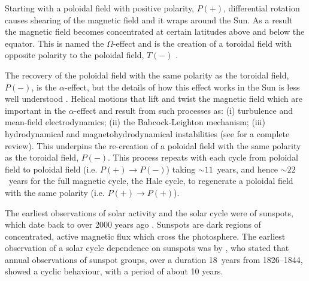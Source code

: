 Starting with a poloidal field with positive polarity, $P(+)$, differential rotation causes shearing of the magnetic field and it wraps around the Sun. As a result the magnetic field becomes concentrated at certain latitudes above and below the equator. This is named the $\Omega$-effect and is the creation of a toroidal field with opposite polarity to the poloidal field, $T(-)$ \citep{hathaway_solar_2015}.

The recovery of the poloidal field with the same polarity as the toroidal field, $P(-)$, is the $\alpha$-effect, but the details of how this effect works in the Sun is less well understood \citep{hathaway_solar_2015}. Helical motions that lift and twist the magnetic field which are important in the $\alpha$-effect \citep{babcock_topology_1961} and result from such processes as: (i) turbulence and mean-field electrodynamics; (ii) the Babcock-Leighton mechanism; (iii) hydrodynamical and magnetohydrodynamical instabilities (see \citet{charbonneau_dynamo_2020} for a complete review). This underpins the re-creation of a poloidal field with the same polarity as the toroidal field, $P(-)$. This process repeats with each cycle from poloidal field to poloidal field (i.e. $P(+)\rightarrow P(-)$) taking $\sim11$~years, and hence $\sim22$~years for the full magnetic cycle, the Hale cycle, to regenerate a poloidal field with the same polarity (i.e. $P(+)\rightarrow P(+)$).%


The earliest observations of solar activity and the solar cycle were of sunspots, which date back to over 2000 years ago \citep{clark_interpretation_1978}. Sunspots are dark regions of concentrated, active magnetic flux which cross the photosphere. The earliest observation of a solar cycle dependence on sunspots was by \citet{schwabe_sonnenbeobachtungen_1844}, who stated that annual observations of sunspot groups, over a duration 18~years from 1826--1844, showed a cyclic behaviour, with a period of about 10 years.

